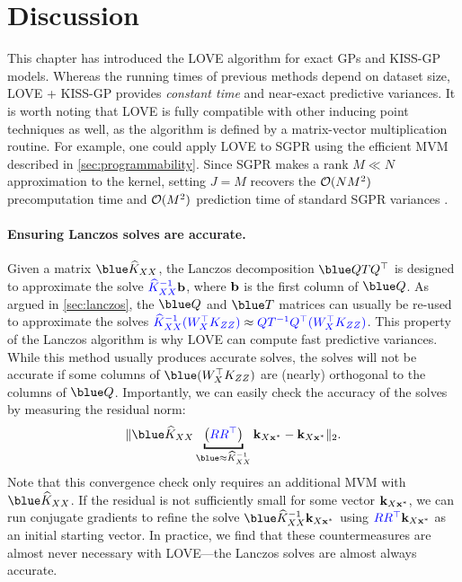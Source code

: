 \section{Discussion}
\label{sec:love_discussion}

This chapter has introduced the LOVE algorithm for exact GPs and KISS-GP models.
Whereas the running times of previous methods depend on dataset size, LOVE{} + KISS-GP provides \emph{constant time} and near-exact predictive variances.
It is worth noting that LOVE is fully compatible with other inducing point techniques as well, as the algorithm is defined by a matrix-vector multiplication routine.
For example, one could apply LOVE to SGPR using the efficient MVM described in \cref{sec:programmability}.
Since SGPR makes a rank $M \ll N$ approximation to the kernel, setting $J\!=\!M$ recovers the $\bigo{NM^{2}}$ precomputation time and $\bigo{M^2}$ prediction time of standard SGPR variances \cite{titsias2009variational}.

\paragraph{Ensuring Lanczos solves are accurate.}
Given a matrix $\blue \trainK$, the Lanczos decomposition $\blue \bQ \bT \bQ^\top$ is designed to approximate the solve ${\color{blue} \widehat{K}_{XX}^{-1}} \mathbf{b}$, where $\mathbf{b}$ is the first column of $\blue \bQ$.
As argued in \cref{sec:lanczos}, the $\blue \bQ$ and $\blue \bT$ matrices can usually be re-used to approximate the solves ${\color{blue} \widehat {K}_{XX}^{-1} (W_{X}^\top K_{ZZ})} \approx {\color{blue} \ensuremath{Q}\ensuremath{T}^{-1} \ensuremath{Q}^\top (\ensuremath{W}_{\ensuremath{X}}^\top \ensuremath{K}_{\ensuremath{Z}\ensuremath{Z}})}$.
This property of the Lanczos algorithm is why LOVE{} can compute fast predictive variances.
While this method usually produces accurate solves, the solves will not be accurate if some columns of $\blue (\bW^\top_{\bX} \bK_{\bZ\bZ})$ are (nearly) orthogonal to the columns of $\blue \bQ$.
Importantly, we can easily check the accuracy of the solves by measuring the residual norm:
%
\[
  \Vert {\blue \trainK} \underbracket{\left( {\color{blue} \bR \bR^\top} \right)}_{\blue \approx \trainK^{-1}} \bk_{\bX \bxtest} - \bk_{\bX \bxtest} \Vert_2.
\]
%
Note that this convergence check only requires an additional MVM with $\blue \trainK$.
If the residual is not sufficiently small for some vector $\mathbf{k}_{X \mathbf{x}^*}$, we can run conjugate gradients to refine the solve ${\blue \trainK^{-1}} \bk_{\bX \bxtest}$ using ${\color{blue} R R^\top} \mathbf{k}_{X \mathbf{x}^*}$ as an initial starting vector.
In practice, we find that these countermeasures are almost never necessary with LOVE{}---the Lanczos solves are almost always accurate.

